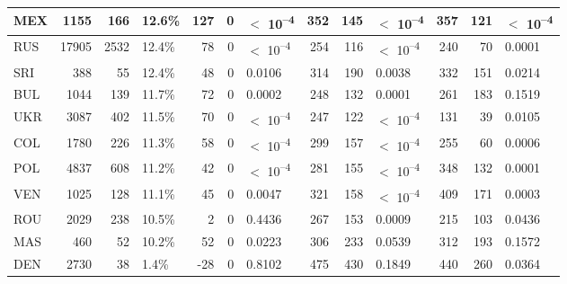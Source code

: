 \begin{tabular}{l|r|r|l|r|r|l|r|r|l|r|r|l}
\hline
MEX & 1155 & 166 & 12.6\% & 127 & 0 & $<$ 10\textsuperscript{--4} & 352 & 145 & $<$ 10\textsuperscript{--4} & 357 & 121 & $<$ 10\textsuperscript{--4}\\
\hline
RUS & 17905 & 2532 & 12.4\% & 78 & 0 & $<$ 10\textsuperscript{--4} & 254 & 116 & $<$ 10\textsuperscript{--4} & 240 & 70 & 0.0001\\
\hline
SRI & 388 & 55 & 12.4\% & 48 & 0 & 0.0106 & 314 & 190 & 0.0038 & 332 & 151 & 0.0214\\
\hline
BUL & 1044 & 139 & 11.7\% & 72 & 0 & 0.0002 & 248 & 132 & 0.0001 & 261 & 183 & 0.1519\\
\hline
UKR & 3087 & 402 & 11.5\% & 70 & 0 & $<$ 10\textsuperscript{--4} & 247 & 122 & $<$ 10\textsuperscript{--4} & 131 & 39 & 0.0105\\
\hline
COL & 1780 & 226 & 11.3\% & 58 & 0 & $<$ 10\textsuperscript{--4} & 299 & 157 & $<$ 10\textsuperscript{--4} & 255 & 60 & 0.0006\\
\hline
POL & 4837 & 608 & 11.2\% & 42 & 0 & $<$ 10\textsuperscript{--4} & 281 & 155 & $<$ 10\textsuperscript{--4} & 348 & 132 & 0.0001\\
\hline
VEN & 1025 & 128 & 11.1\% & 45 & 0 & 0.0047 & 321 & 158 & $<$ 10\textsuperscript{--4} & 409 & 171 & 0.0003\\
\hline
ROU & 2029 & 238 & 10.5\% & 2 & 0 & 0.4436 & 267 & 153 & 0.0009 & 215 & 103 & 0.0436\\
\hline
MAS & 460 & 52 & 10.2\% & 52 & 0 & 0.0223 & 306 & 233 & 0.0539 & 312 & 193 & 0.1572\\
\hline
DEN & 2730 & 38 & 1.4\% & -28 & 0 & 0.8102 & 475 & 430 & 0.1849 & 440 & 260 & 0.0364\\
\hline
\end{tabular}

